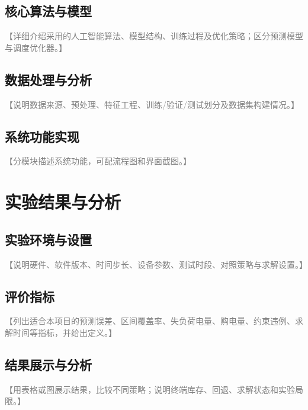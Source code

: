 \documentclass[UTF8,a4paper,zihao=-4]{ctexart}
\newcommand{\fillhint}[1]{\textcolor{gray}{【#1】}}
\begin{document}

\subsection{核心算法与模型}
\fillhint{详细介绍采用的人工智能算法、模型结构、训练过程及优化策略；区分预测模型与调度优化器。}

\subsection{数据处理与分析}
\fillhint{说明数据来源、预处理、特征工程、训练/验证/测试划分及数据集构建情况。}

\subsection{系统功能实现}
\fillhint{分模块描述系统功能，可配流程图和界面截图。}

\section{实验结果与分析}
\subsection{实验环境与设置}
\fillhint{说明硬件、软件版本、时间步长、设备参数、测试时段、对照策略与求解设置。}

\subsection{评价指标}
\fillhint{列出适合本项目的预测误差、区间覆盖率、失负荷电量、购电量、约束违例、求解时间等指标，并给出定义。}

\subsection{结果展示与分析}
\fillhint{用表格或图展示结果，比较不同策略；说明终端库存、回退、求解状态和实验局限。}

\end{document}
